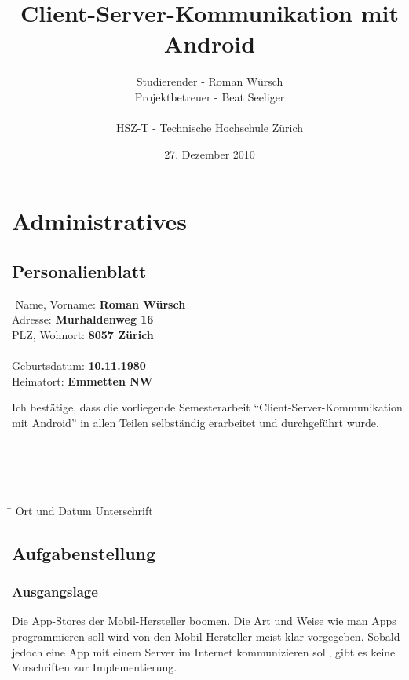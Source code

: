 \documentclass[listof=totoc,bibliography=totoc]{scrreprt}
\title{Client-Server-Kommunikation mit Android}
\author{Studierender - Roman Würsch\\
	Projektbetreuer - Beat Seeliger\\
	\\
	HSZ-T - Technische Hochschule Zürich}
\date{27. Dezember 2010}
\begin{document}
  \ifpdf
  \else
  \fi

  \maketitle


  \tableofcontents

  \chapter{Administratives}

  \section{Personalienblatt}
  \begin{tabbing}
    \hspace*{6cm}\= \kill
    Name, Vorname: \> {\bf Roman Würsch} \\
    Adresse: \> {\bf Murhaldenweg 16} \\
    PLZ, Wohnort: \> {\bf 8057 Zürich} \\
    \\
    Geburtsdatum: \> {\bf 10.11.1980} \\
    Heimatort: \> {\bf Emmetten NW} \\
  \end{tabbing}
  Ich bestätige, dass die vorliegende Semesterarbeit
  ``Client-Server-Kommunikation mit Android'' in allen Teilen selbständig
  erarbeitet und durchgeführt wurde.
  \\
  \\
  \\
  \\
  \\
  \begin{tabbing}
    \hspace*{6cm}\= \kill
    Ort und Datum \> {Unterschrift} \\
  \end{tabbing}
  
  \newpage
  
  \section{Aufgabenstellung}

  \subsection{Ausgangslage}
  Die App-Stores der Mobil-Hersteller boomen. Die Art und Weise wie man Apps
  programmieren soll wird von den Mobil-Hersteller meist klar vorgegeben.
  Sobald jedoch eine App mit einem Server im Internet kommunizieren soll, gibt
  es keine Vorschriften zur Implementierung.
\end{document}
